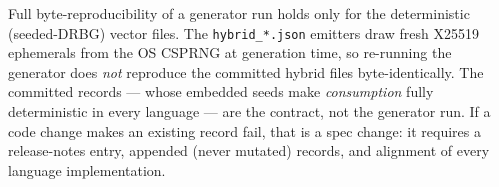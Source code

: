 Full byte-reproducibility of a generator run holds only for the deterministic (seeded-DRBG) vector files. The \texttt{hybrid\_*.json} emitters draw fresh X25519 ephemerals from the OS CSPRNG at generation time, so re-running the generator does \emph{not} reproduce the committed hybrid files byte-identically. The committed records --- whose embedded seeds make \emph{consumption} fully deterministic in every language --- are the contract, not the generator run. If a code change makes an existing record fail, that is a spec change: it requires a release-notes entry, appended (never mutated) records, and alignment of every language implementation.
